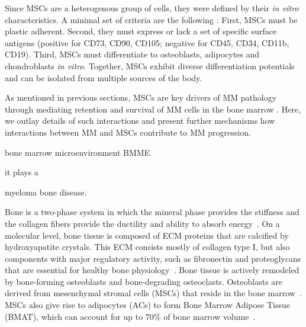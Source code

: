 Since \acp{MSC} are a heterogenous group of cells, they were defined by their
\textit{in vitro} characteristics. A minimal set of criteria are the following
\cite{dominiciMinimalCriteriaDefining2006}: First, \acp{MSC} must be plastic
adherent. Second, they must express or lack a set of specific surface antigens
(positive for CD73, CD90, CD105; negative for CD45, CD34, CD11b, CD19). Third,
\acp{MSC} must differentiate to osteoblasts, adipocytes and chondroblasts \textit{in
    vitro}. Together, \acp{MSC} exhibit diverse differentiation potentials and can be
isolated from multiple sources of the body.




\label{sec:intro_myeloma_hMSC}
As mentioned in previous sections, MSCs are key drivers of \ac{MM} pathology through
mediating retention and survival of \ac{MM} cells in the bone marrow
\cite{mangoliniBoneMarrowStromal2020}. Here, we outlay details of such
interactions and present further mechanisms how interactions between \ac{MM} and \acp{MSC}
contribute to \ac{MM} progression.

bone marrow microenvironment \ac{BMME}



it plays a

myeloma bone disease.

Bone is a two-phase system in which the mineral phase provides the stiffness and
the collagen fibers provide the ductility and ability to absorb
energy~\cite{viguet-carrinRoleCollagenBone2006}. On a molecular level, bone
tissue is composed of \ac{ECM} proteins that are calcified by
hydroxyapatite crystals. This \ac{ECM} consists mostly of collagen type I, but also
components with major regulatory activity, such as fibronectin and proteoglycans
that are essential for healthy bone
physiology~\cite{alcorta-sevillanoDecipheringRelevanceBone2020}. Bone tissue is
actively remodeled by bone-forming osteoblasts and bone-degrading osteoclasts.
Osteoblasts are derived from mesenchymal stromal cells (MSCs) that reside in the
bone marrow~\cite{friedensteinOsteogenesisTransplantsBone1966,
    pittengerMultilineagePotentialAdult1999}. MSCs also give rise to adipocytes
(ACs) to form Bone Marrow Adipose Tissue (BMAT), which can account for up to
70\% of bone marrow volume~\cite{fazeliMarrowFatBone2013}.


